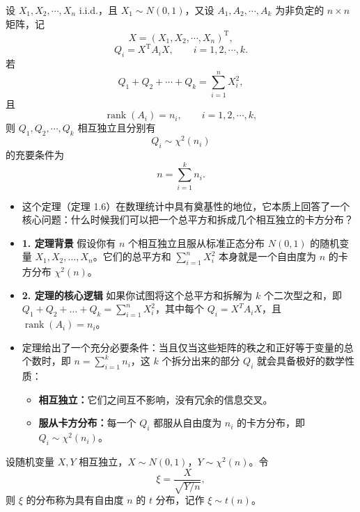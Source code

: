 \begin{theorem}
设 $X_1,X_2,\cdots,X_n$ i.i.d.，且 $X_1\sim N(0,1)$，又设 $A_1,A_2,\cdots,A_k$ 为非负定的 $n\times n$ 矩阵，记
\[
X=(X_1,X_2,\cdots,X_n)^{\mathrm T},
\]
\[
Q_i=X^{\mathrm T}A_iX,\qquad i=1,2,\cdots,k.
\]
若
\[
Q_1+Q_2+\cdots+Q_k=\sum_{i=1}^n X_i^2,
\]
且
\[
\operatorname{rank}(A_i)=n_i,\qquad i=1,2,\cdots,k,
\]
则 $Q_1,Q_2,\cdots,Q_k$ 相互独立且分别有
\[
Q_i\sim \chi^2(n_i)
\]
的充要条件为
\[
n=\sum_{i=1}^k n_i.
\]
\end{theorem}

\begin{note}
\begin{itemize}
    \item 这个定理（定理 1.6）在数理统计中具有奠基性的地位，它本质上回答了一个核心问题：什么时候我们可以把一个总平方和拆成几个相互独立的卡方分布？
    
    \item \textbf{1. 定理背景} 假设你有 $n$ 个相互独立且服从标准正态分布 $N(0,1)$ 的随机变量 $X_1,X_2,\dots,X_n$。它们的总平方和 $\sum_{i=1}^n X_i^2$ 本身就是一个自由度为 $n$ 的卡方分布 $\chi^2(n)$。
    
    \item \textbf{2. 定理的核心逻辑} 如果你试图将这个总平方和拆解为 $k$ 个二次型之和，即 $Q_1+Q_2+\dots+Q_k=\sum_{i=1}^n X_i^2$，其中每个 $Q_i=X^T A_i X$，且 $\operatorname{rank}(A_i)=n_i$。
    
    \item 定理给出了一个充分必要条件：当且仅当这些矩阵的秩之和正好等于变量的总个数时，即 $n=\sum_{i=1}^k n_i$，这 $k$ 个拆分出来的部分 $Q_i$ 就会具备极好的数学性质：
    \begin{itemize}
        \item \textbf{相互独立：}它们之间互不影响，没有冗余的信息交叉。
        \item \textbf{服从卡方分布：}每一个 $Q_i$ 都服从自由度为 $n_i$ 的卡方分布，即 $Q_i\sim \chi^2(n_i)$。
    \end{itemize}
\end{itemize}
\end{note}
\begin{definition}
设随机变量 $X,Y$ 相互独立，$X\sim N(0,1)$，$Y\sim \chi^2(n)$。令
\[
\xi=\frac{X}{\sqrt{Y/n}},
\]
则 $\xi$ 的分布称为具有自由度 $n$ 的 $t$ 分布，记作 $\xi\sim t(n)$。
\end{definition}
